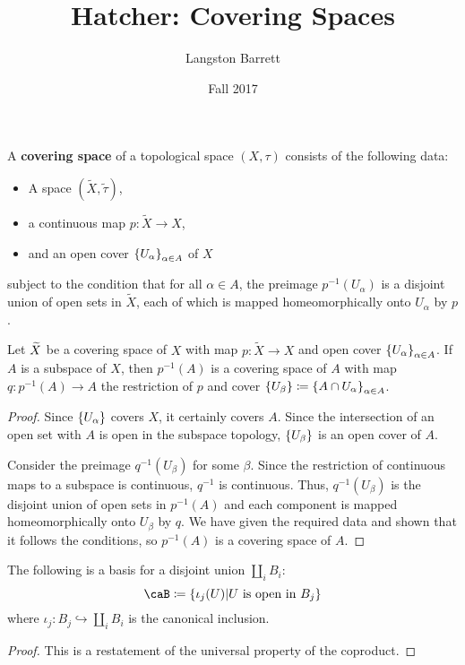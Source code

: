 \documentclass[a5paper]{article}
\begin{document}
\title{Hatcher: Covering Spaces}
\author{Langston Barrett}
\date{Fall 2017}

\begin{definition*}
	A \textbf{covering space} of a topological space $(X,\tau)$ consists of the
  following data:
  \begin{itemize}
    \itemsep0em
    \item A space $(\widetilde{X},\widetilde{\tau})$,
    \item a continuous map $p:\widetilde{X}\to X$,
    \item and an open cover $\left\{U_\alpha\right\}_{\alpha\in A}$ of $X$
  \end{itemize}
  subject to the condition that for all $\alpha\in A$, the preimage
  $p^{-1}(U_\alpha)$ is a disjoint union of open sets in $\widetilde{X}$, each of
  which is mapped homeomorphically onto $U_\alpha$ by $p$.
\end{definition*}
\begin{proposition*}
	Let $\widetilde{X}$ be a covering space of $X$ with map $p:\widetilde{X}\to X$ and
  open cover $\left\{U_\alpha\right\}_{\alpha\in A}$. If $A$ is a subspace of $X$, then
  $p^{-1}(A)$ is a covering space of $A$ with map $q:p^{-1}(A)\to A$
  the restriction of $p$ and cover
  $\left\{U_\beta\right\}\coloneqq \left\{A\cap U_\alpha\right\}_{\alpha\in A}$.
\end{proposition*}
\begin{proof}
  Since $\left\{U_\alpha\right\}$ covers $X$, it certainly covers $A$. Since the
  intersection of an open set with $A$ is open in the subspace topology,
  $\left\{U_\beta\right\}$ is an open cover of $A$.

  Consider the preimage $q^{-1}(U_\beta)$ for some $\beta$.
  Since the restriction of continuous maps to a subspace is continuous,
  $q^{-1}$ is continuous. Thus, $q^{-1}(U_\beta)$ is the disjoint union of open
  sets in $p^{-1}(A)$ and each component is mapped homeomorphically onto
  $U_\beta$ by $q$. We have given the required data and shown that it follows
  the conditions, so $p^{-1}(A)$ is a covering space of $A$.
\end{proof}


\begin{lemma*}
  The following is a basis for a disjoint union $\coprod_i B_i$:
  \begin{equation*}
    \caB \coloneqq \braces{\iota_j(U)|U\text{ is open in }B_j}
  \end{equation*}
  where $\iota_j:B_j\hookrightarrow \coprod_i B_i$ is the canonical inclusion.
\end{lemma*}
\begin{proof}
	This is a restatement of the universal property of the coproduct.
\end{proof}
\end{document}

